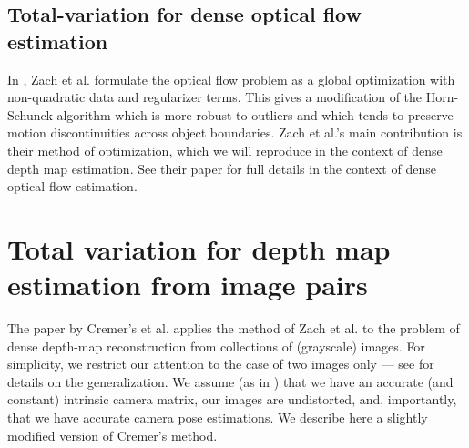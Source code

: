 \documentclass[conference]{IEEEtran}
\begin{document}
\subsection{Total-variation for dense optical flow estimation}
In \cite{tv_optical_flow}, Zach et al. formulate the optical flow problem
as a global optimization with non-quadratic data and regularizer terms.
This gives a modification
of the Horn-Schunck algorithm which is more robust to outliers and which tends to preserve motion discontinuities across object boundaries.
Zach et al.'s main contribution is their method of optimization,
which we will reproduce in the context of dense depth map estimation.
See their paper \cite{tv_optical_flow} for full details in the context of dense optical flow estimation.

\section{Total variation for depth map estimation from image pairs}
The paper by Cremer's et al. \cite{dense_geometry} applies the method of Zach et al. \cite{tv_optical_flow} to
the problem of dense depth-map
reconstruction from collections of (grayscale) images. For simplicity, we restrict our attention to the case of two images only ---
see \cite{dense_geometry} for details on the generalization. We assume (as in \cite{dense_geometry}) that we have an accurate (and constant) intrinsic camera matrix,
our images are undistorted, and, importantly, that we have accurate camera pose estimations. We describe here a slightly modified version of Cremer's method.
\end{document}
